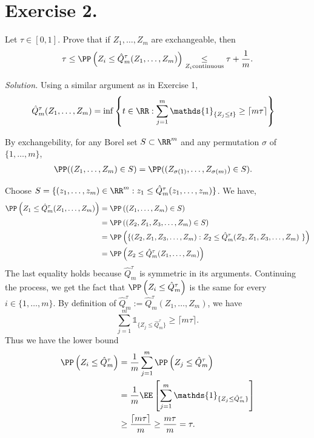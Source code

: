 \section{Exercise 2.} Let $\tau\in[0,1]$. Prove that if $Z_1,\ldots,Z_m$ are exchangeable, then
$$\tau \le \PP\left(Z_i \le \hat{Q}^{\tau}_m(Z_1,\ldots,Z_m)\right) \underset{Z_i \text{continuous}}{\le} \tau + \dfrac{1}{m}.$$

\textit{Solution.} Using a similar argument as in Exercise 1,
\begin{align*}
  \hat{Q}_m^{\tau}(Z_1,\ldots,Z_m)
   & = \inf\left\{t\in \RR:  \sum_{j=1}^{m} \mathds{1}_{\{Z_j\le t\}} \ge \lceil m\tau\rceil\right\}
\end{align*}

By exchangebility, for any Borel set $S\subset\RR^m$ and any permutation $\sigma$ of $\{1,\ldots,m\}$,
\begin{align*}
  \PP((Z_1,\ldots,Z_m)\in S)
   & = \PP((Z_{\sigma(1)},\ldots,Z_{\sigma(m)})\in S).
\end{align*}

Choose $S=\{(z_1,\ldots,z_m)\in\RR^m: z_1\le \hat{Q}^{\tau}_m(z_1,\ldots,z_m)\}$. We have,
\begin{align*}
  \PP\left(Z_1\le \hat{Q}^{\tau}_m(Z_1,\ldots,Z_m)\right)
   & = \PP\left((Z_1,\ldots,Z_m)\in S\right)                                                           \\
   & = \PP\left((Z_2,Z_1,Z_3,\ldots,Z_m)\in S\right)                                                   \\
   & = \PP\left(\{(Z_2,Z_1,Z_3,\ldots,Z_m) :Z_2\le \hat{Q}^{\tau}_m(Z_2,Z_1,Z_3,\ldots,Z_m)\ \}\right) \\
   & = \PP\left(Z_2\le \hat{Q}^{\tau}_m(Z_1,\ldots,Z_m)\right)
\end{align*}
The last equality holds because $\hat{Q}^{\tau}_m$ is symmetric in its arguments.  Continuing the process, we get the fact that $\PP\left(Z_i \le \hat{Q}^{\tau}_m\right)$ is the same for every $i\in\{1,\ldots,m\}$. By definition of $\hat{Q}^{\tau}_m := \hat{Q}_m^{\tau}(Z_1,\ldots,Z_m)$, we have
$$\sum_{j=1}^{m} \mathds{1}_{\{Z_j\le \hat{Q}^{\tau}_m\}} \ge \lceil m\tau\rceil.$$
Thus we have the lower bound
\begin{align*}
  \PP\left(Z_i \le \hat{Q}^{\tau}_m\right)
   & = \dfrac{1}{m} \sum_{j=1}^{m} \PP\left(Z_j \le \hat{Q}^{\tau}_m\right)                 \\
   & = \dfrac{1}{m} \EE\left[\sum_{j=1}^{m} \mathds{1}_{\{Z_j\le \hat{Q}^{\tau}_m\}}\right] \\
   & \ge \dfrac{\lceil m\tau\rceil}{m} \ge \dfrac{m\tau}{m}=\tau.
\end{align*}

